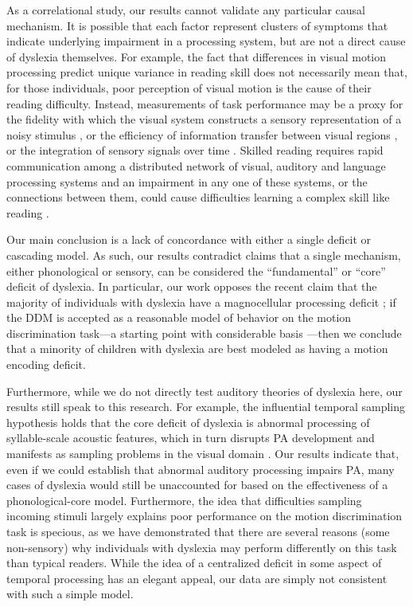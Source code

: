 \documentclass[../uwthesis.tex]{subfiles}
\begin{document}
As a correlational study, our results cannot validate any particular causal mechanism. It is possible that each factor represent clusters of symptoms that indicate underlying impairment in a processing system, but are not a direct cause of dyslexia themselves. For example, the fact that differences in visual motion processing predict unique variance in reading skill does not necessarily mean that, for those individuals, poor perception of visual motion is the cause of their reading difficulty. Instead, measurements of task performance may be a proxy for the fidelity with which the visual system constructs a sensory representation of a noisy stimulus \cite{Sperling2005DeficitsDyslexia}, or the efficiency of information transfer between visual regions
\cite{Yeatman2012DevelopmentSkills,Yeatman2013AnatomyConnections}, or the integration of sensory signals over time \cite{Joo2017}. Skilled reading requires rapid communication among a distributed network of visual, auditory and language processing systems and an impairment in any one of these systems, or the connections between them, could cause difficulties learning a complex skill like reading \cite{Wandell2013BiologicalCircuits}.

Our main conclusion is a lack of concordance with either a single deficit or cascading model. As such, our results contradict claims that a single mechanism, either phonological or sensory, can be considered the “fundamental” or “core” deficit of dyslexia. In particular, our work opposes the recent claim that the majority of individuals with dyslexia have a magnocellular processing deficit \cite{Stein2018TheDyslexia}; if the DDM is accepted as a reasonable model of behavior on the motion discrimination task---a starting point with considerable basis \cite{Huang-Pollock2017UsingDisorder,Palmer2005TheDecision,Ratcliff2008TheTasks}---then we conclude that a minority of children with dyslexia are best modeled as having a motion encoding deficit. 

Furthermore, while we do not directly test auditory theories of dyslexia here, our results still speak to this research. For example, the influential temporal sampling hypothesis holds that the core deficit of dyslexia is abnormal processing of syllable-scale acoustic features, which in turn disrupts PA development and manifests as sampling problems in the visual domain \cite{Casini2018ItsDyslexia,Goswami2011}. Our results indicate that, even if we could establish that abnormal auditory processing impairs PA, many cases of dyslexia would still be unaccounted for based on the effectiveness of a phonological-core model. Furthermore, the idea that difficulties sampling incoming stimuli largely explains poor performance on the motion discrimination task is specious, as we have demonstrated that there are several reasons (some non-sensory) why individuals with dyslexia may perform differently on this task than typical readers. While the idea of a centralized deficit in some aspect of temporal processing has an elegant appeal, our data are simply not consistent with such a simple model. 
\end{document}
